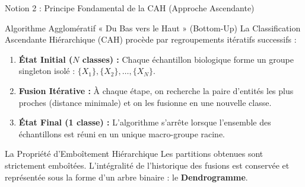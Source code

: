 \documentclass[aspectratio=169,10pt]{beamer}
\begin{document}
\begin{frame}{Notion 2 : Principe Fondamental de la CAH (Approche Ascendante)}
  \begin{conceptbox}{Algorithme Agglomératif « Du Bas vers le Haut » (Bottom-Up)}
    \footnotesize
    La Classification Ascendante Hiérarchique (CAH) procède par regroupements itératifs successifs :
    \begin{enumerate}
      \item \textbf{État Initial ($N$ classes) :} Chaque échantillon biologique forme un groupe singleton isolé : $\{X_1\}, \{X_2\}, \dots, \{X_N\}$.
      \item \textbf{Fusion Itérative :} À chaque étape, on recherche la paire d'entités les plus proches (distance minimale) et on les fusionne en une nouvelle classe.
      \item \textbf{État Final (1 classe) :} L'algorithme s'arrête lorsque l'ensemble des échantillons est réuni en un unique macro-groupe racine.
    \end{enumerate}
  \end{conceptbox}
  \vspace{1mm}
  \begin{takeawaybox}{La Propriété d'Emboîtement Hiérarchique}
    \footnotesize
    Les partitions obtenues sont strictement emboîtées. L'intégralité de l'historique des fusions est conservée et représentée sous la forme d'un arbre binaire : le \textbf{Dendrogramme}.
  \end{takeawaybox}
\end{frame}
\end{document}
